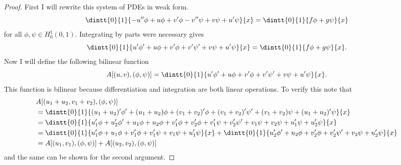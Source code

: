 \documentclass[11pt, oneside]{article}
\begin{document}
\begin{enumerate}
    \begin{proof}
      First I will rewrite this system of PDEs in weak form.
      \[
        \dintt{0}{1}{-u'' \phi + u\phi + v'\phi - v'' \psi + v\psi + u'\psi}{x} = \dintt{0}{1}{f\phi + g \psi}{x}
      \]
      for all $\phi, \psi \in H^1_0(0, 1)$.
      Integrating by parts were necessary gives
      \[
        \dintt{0}{1}{u' \phi' + u\phi + v'\phi + v' \psi' + v\psi + u'\psi}{x} = \dintt{0}{1}{f\phi + g \psi}{x}.
      \]
      Now I will define the following bilinear function
      \[
        A[(u, v), (\phi, \psi)] = \dintt{0}{1}{u' \phi' + u\phi + v'\phi + v' \psi' + v\psi + u'\psi}{x}.
      \]
      This function is bilinear because differentiation and integration are both
      linear operations.
      To verify this note that
      \begin{align*}
        &A[(u_1 + u_2, v_1 + v_2), (\phi, \psi)] \\
        &= \dintt{0}{1}{(u_1 + u_2)' \phi' + (u_1 + u_2)\phi + (v_1 + v_2)'\phi + (v_1 + v_2)' \psi' + (v_1 + v_2)\psi + (u_1 + u_2)'\psi}{x} \\
        &= \dintt{0}{1}{u_1'\phi + u_2' \phi' + u_1\phi + u_2\phi + v_1'\phi + v_2'\phi + v_1'\psi + v_2' \psi' + v_1\psi + v_2\psi + u_1'\psi + u_2'\psi}{x} \\
        &= \dintt{0}{1}{u_1'\phi + u_1 \phi + v_1' \phi + v_1'\psi + v_1\psi + u_1'\psi}{x} + \dintt{0}{1}{u_2' \phi' + u_2\phi + v_2'\phi + v_2' \psi' + v_2\psi + u_2'\psi}{x} \\
        &= A[(u_1, v_1), (\phi, \psi)] + A[(u_2, v_2), (\phi, \psi)]
      \end{align*}
      and the same can be shown for the second argument.


\end{proof}
\end{enumerate}
\end{document}
